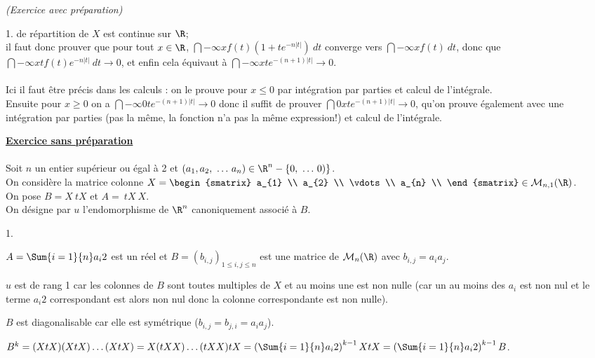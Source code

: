 \documentclass[11pt]{article}%
\begin{document}
\begin{exercice}{\it (Exercice avec préparation)}
\begin{noliste}{1.}
    de répartition de $X$ est continue sur $\R$; \\
    il faut donc prouver que pour tout $x \in \R$, $\dint{-\infty}{x}
    f(t) \left( 1 + t e^{ - n | t |} \right)\ dt$ converge vers
    $\dint{-\infty}{x} f(t)\ dt$, donc que $\dint{-\infty}{x} t f(t)
    e^{- n | t |}\ dt \rightarrow0$, et enfin cela équivaut à
    $\dint{-\infty}{x} t
    e^{ - (n + 1) | t |} \rightarrow 0.$ \\
    \\
    Ici il faut être précis dans les calculs : on le prouve pour $x
    \leq
    0$ par intégration par parties et calcul de l'intégrale. \\
    Ensuite pour $x \geq 0$ on a $\dint{-\infty}{0} t e^{ - (n + 1) |
      t |} \rightarrow 0$ donc il suffit de prouver $\dint{0}{x} t e^{
      - (n + 1) | t |} \rightarrow 0$, qu'on prouve également avec une
    intégration par parties (pas la même, la fonction n'a pas la même
    expression!) et
    calcul de l'intégrale. \\
  \end{noliste}
  \noindent \textbf{\underline{Exercice sans préparation}} \\
  \\
  Soit $n$ un entier supérieur ou égal à 2 et $(a_{1}, a_{2},\ \dots\,
  a_{n}) \in \R^{n} - \{ 0,\ \dots\,0) \}$. \\
  On considère la matrice colonne $X = \begin{smatrix}
    a_{1} \\
    a_{2} \\
    \vdots \\
    a_{n} \\
  \end{smatrix}
  \in \mathcal{M}_{n,1} (\R)$. \\
  On pose $B = X\ {}{t}X $ et $A = \ {}{t}X\ X$. \\
  On désigne par $u$ l'endomorphisme de $\R^{n}$ canoniquement associé
  à $B$.
  \begin{noliste}{1.}
    \setlength{\itemsep}{4mm}
  \item $A = \Sum{i = 1}{n} a_{i}{2}$ est un réel et $B = ( b_{i,j}
    )_{ 1 \leq i,j \leq n}$ est une matrice de $\mathcal{M}_{n} (\R)$
    avec $b_{i,j} = a_{i} a_{j}$.
  \item $u$ est de rang 1 car les colonnes de $B$ sont toutes
    multiples de $X$ et au moins une est non nulle (car un au moins
    des $a_{i}$ est non nul et le terme $a_{i}{2}$ correspondant est
    alors non nul donc la colonne correspondante est non nulle).
  \item $B$ est diagonalisable car elle est symétrique ($b_{i,j} =
    b_{j,i} = a_{i} a_{j}$). \\
  \item $B^{k} = (X {}{t} X ) (X {}{t} X ) \dots (X {}{t} X ) = X ({}{t}
    X X) \dots ({}{t} X X) {}{t} X = \left( \Sum{i = 1}{n} a_{i}{2}
    \right)^{k-1} X {}{t} X = \left( \Sum{i = 1}{n} a_{i}{2} \right)^{k-1}
    B$.
  \end{noliste}
\end{exercice}
\end{document}
